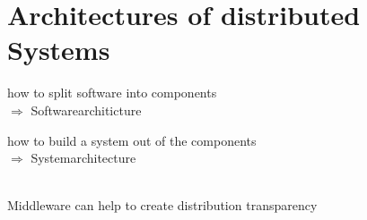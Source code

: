 \documentclass[ngerman,a4paper]{report}
\begin{document}
\chapter{Architectures of distributed Systems}

\begin{compactitem}
\item how to split software into components\\
$\Rightarrow$ Softwarearchiticture
\item how to build a system out of the components\\
$\Rightarrow$ Systemarchitecture
\end{compactitem}
\ \\
Middleware can  help to create distribution transparency\\
\end{document}
